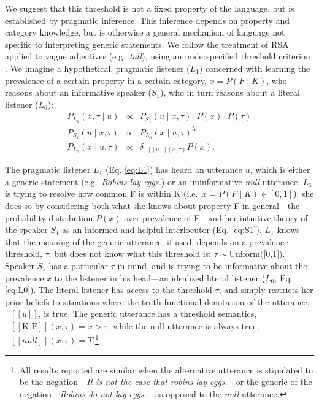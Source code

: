 \documentclass{pnastwo}
\newcommand{\denote}[1]{\mbox{ $[\![ #1 ]\!]$}}
\begin{document}
\begin{article}
We suggest that this threshold is not a fixed property of the language, but is established by pragmatic inference.
This inference depends on property and category knowledge, but is otherwise a general mechanism of language not specific to interpreting generic statements.
We follow the treatment of RSA applied to vague adjectives (e.g.~\emph{tall}), using an underspecified threshold criterion \cite{Lassiter2013,Lassiter2015}. %
We imagine a hypothetical, pragmatic listener ($L_1$) concerned with learning the prevalence of a certain property in a certain category, $x=P(F \mid K)$, who reasons about an informative speaker ($S_1$), who in turn reasons about a literal listener ($L_0$):
\begin{eqnarray}
P_{L_{1}}(x , \tau \mid u) &\propto& P_{S_{1}}(u \mid x, \tau) \cdot P(x) \cdot P(\tau) \label{eq:L1}\\
P_{S_{1}}(u \mid x, \tau) &\propto&  {P_{L_{0}}(x \mid u, \tau)}^{\lambda} \label{eq:S1}\\
P_{L_{0}}(x \mid u, \tau) &\propto& {\delta_{\denote{u}(x, \tau)} P(x)}. \label{eq:L0}
\end{eqnarray}




The pragmatic listener $L_{1}$ (Eq. \ref{eq:L1}) has heard an utterance $u$, which is either a generic statement (e.g.~\emph{Robins lay eggs.}) or an uninformative \emph{null} utterance. 
$L_1$ is trying to resolve how common F is within K (i.e.~$x = P(F\mid K) \in [0, 1]$); she does so by considering both what she knows about property F in general---the probability distribution $P(x)$ over prevalence of F---and her intuitive theory of the speaker $S_{1}$ as an informed and helpful interlocutor (Eq. \ref{eq:S1}).
$L_1$ knows that the meaning of the generic utterance, if used, depends on a prevalence threshold, $\tau$, but does not know what this threshold is: $\tau \sim \text{Uniform([0,1])}$.
Speaker $S_1$ has a particular $\tau$ in mind, and is trying to be informative about the prevalence $x$ to the listener in his head---an idealized literal listener ($L_{0}$, Eq. \ref{eq:L0}).
The literal listener has access to the threshold $\tau$, and simply restricts her prior beliefs to situations where the truth-functional denotation of the utterance, $\denote{u}$, is true.
The generic utterance has a threshold semantics, $\denote{\text{K F}}(x, \tau)=x>\tau$; while the null utterance is always true, $\denote{null}(x, \tau)=T$.\footnote{All results reported are similar when the alternative utterance is stipulated to be the negation---\emph{It is not the case that robins lay eggs.}---or the generic of the negation---\emph{Robins do not lay eggs.}---as opposed to the \emph{null} utterance.}



\end{article}
\end{document}
